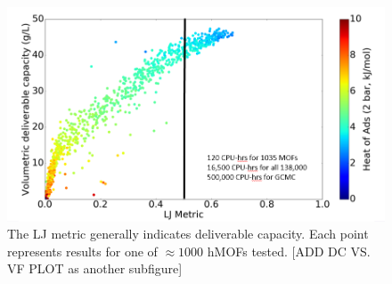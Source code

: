 \documentclass[letterpaper]{article}
\begin{document}
\begin{figure}[H]
	\centering
	\includegraphics[width=0.75\columnwidth]{Figs/lj_metric.png}
	\caption{The LJ metric generally indicates deliverable capacity.  Each point represents results for one of $\approx 1000$ hMOFs tested. [ADD DC VS. VF PLOT as another subfigure]}
	\label{fig:lj_metric}
\end{figure}
\end{document}
